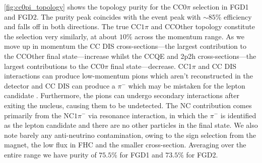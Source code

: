 \autoref{fig:cc0pi_topology} shows the topology purity for the CC0$\pi$ selection in FGD1 and FGD2. The purity peak coincides with the event peak with $\sim85\%$ efficiency and falls off in both directions. The true CC$1\pi$ and CCOther topology constitute the selection very similarly, at about $10\%$ across the momentum range. As we move up in momentum the CC DIS cross-sections---the largest contribution to the CCOther final state---increase whilst the CCQE and 2p2h cross-sections---the largest contributions to the CC0$\pi$ final state---decrease. CC1$\pi$ and CC DIS interactions can produce low-momentum pions which aren't reconstructed in the detector and CC DIS can produce a $\pi^-$ which may be mistaken for the lepton candidate . Furthermore, the pions can undergo secondary interactions after exiting the nucleus, causing them to be undetected. The NC contribution comes primarily from the NC$1\pi^-$ via resonance interaction, in which the $\pi^-$ is identified as the lepton candidate and there are no other particles in the final state. We also note barely any anti-neutrino contamination, owing to the sign selection from the magnet, the low \numubar flux in FHC and the smaller cross-section. Averaging over the entire range we have purity of $75.5\%$ for FGD1 and $73.5\%$ for FGD2.
